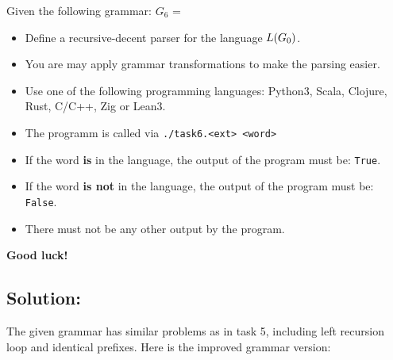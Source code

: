 \documentclass[10pt, a4paper]{article}
\begin{document}
\newpage


Given the following grammar: $G_6$ = 

\begin{itemize}
    \item Define a recursive-decent parser for the language $L(G_\thesection)$. 
    \item You are may apply grammar transformations to make the parsing easier.
    \item Use one of the following programming languages: Python3, Scala, Clojure, Rust, C/C++, Zig or Lean3.
    \item The programm is called via \texttt{./task6.<ext> <word>}
    \item If the word \textbf{is} in the language, the output of the program must be: \textquotedbl\texttt{True}\textquotedbl.
    \item If the word \textbf{is not} in the language, the output of the program must be: \textquotedbl\texttt{False}\textquotedbl.
    \item There must not be any other output by the program.
\end{itemize}
\vspace{1cm}

\textbf{Good luck!}

\subsection{Solution:}

The given grammar has similar problems as in task 5, including left recursion loop and identical prefixes. Here is the improved grammar version:
\end{document}
